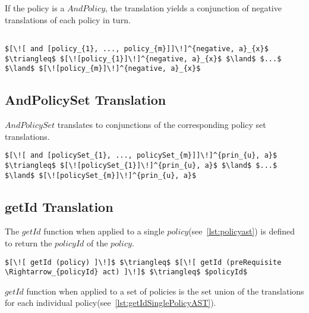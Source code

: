 If the policy is a $AndPolicy$, the translation yields a conjunction of negative translations of each policy in turn.

\lstset{mathescape, language=AST}  
\begin{lstlisting}[frame=single, caption={Negative Policy Translation {$\colon$} List of policies},label={lst:transpolicynegativeListOfPolicies}]

$[\![ and [policy_{1}, ..., policy_{m}]]\!]^{negative, a}_{x}$ $\triangleq$ $[\![policy_{1}]\!]^{negative, a}_{x}$ $\land$ $...$ $\land$ $[\![policy_{m}]\!]^{negative, a}_{x}$

\end{lstlisting}

\subsection{AndPolicySet Translation}
$AndPolicySet$ translates to conjunctions of the corresponding policy set translations. 

\lstset{mathescape, language=AST}  
\begin{lstlisting}[frame=single, caption={Policy Set Translation {$\colon$} AndPolicySet},label={lst:transpolicyformulaAndPolicySet}]
$[\![ and [policySet_{1}, ..., policySet_{m}]]\!]^{prin_{u}, a}$ $\triangleq$ $[\![policySet_{1}]\!]^{prin_{u}, a}$ $\land$ $...$ $\land$ $[\![policySet_{m}]\!]^{prin_{u}, a}$

\end{lstlisting}

\subsection{getId Translation}\label{sec:getIdtranslation}

The $getId$ function when applied to a single $policy$(see~\ref{lst:policyast}) is defined to return the $policyId$ of the $policy$.

\lstset{mathescape, language=AST}  
\begin{lstlisting}[frame=single, caption={getId for a Single policy},label={lst:getIdSinglePolicyAST}]
$[\![ getId (policy) ]\!]$ $\triangleq$ $[\![ getId (preRequisite \Rightarrow_{policyId} act) ]\!]$ $\triangleq$ $policyId$
\end{lstlisting}

$getId$ function when applied to a set of policies is the set union of the translations for each individual policy(see~\ref{lst:getIdSinglePolicyAST}).

